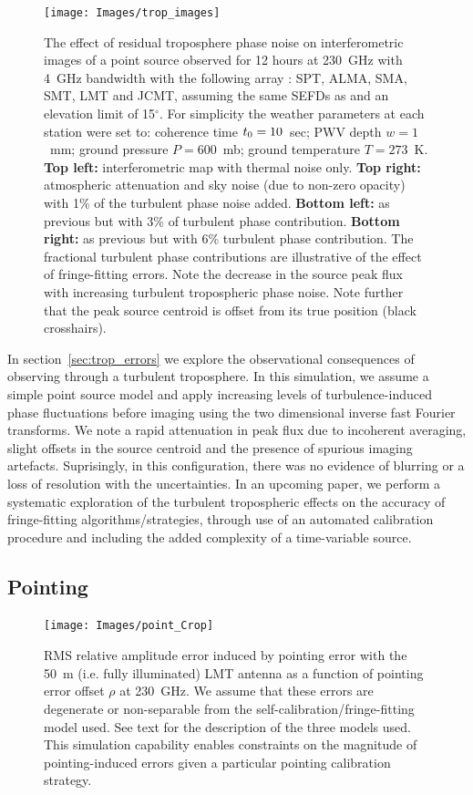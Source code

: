 \begin{figure}
\begin{center}
\texttt{[image: Images/trop\_images]}
\caption{The effect of residual troposphere phase noise on interferometric images of a point source observed for 12 hours at 230~GHz with 4~GHz bandwidth with the following array : SPT, ALMA, SMA, SMT, LMT and JCMT, assuming the same SEFDs as \protect\citet{Lu_2014} and an elevation limit of 15$^\circ$. For simplicity the weather parameters at each station were set to: coherence time $t_{\rm 0}=10$~sec; PWV depth $w=1$~mm; ground pressure $P=600$~mb; ground temperature $T =273$~K. {\bf Top left:} interferometric map with thermal noise only. {\bf Top right:} atmospheric attenuation and sky noise (due to non-zero opacity) with 1\% of the turbulent phase noise added. {\bf Bottom left:} as previous but with 3\% of turbulent phase contribution. {\bf Bottom right:} as previous but with 6\% turbulent phase contribution. The fractional turbulent phase contributions are illustrative of the effect of fringe-fitting errors. Note the decrease in the source peak flux with increasing turbulent tropospheric phase noise. Note further that the peak source centroid is offset from its true position (black crosshairs). \label{fig:trop_images}%
}
\end{center}
\end{figure}


In section~\ref{sec:trop_errors} we explore the observational consequences of observing through a turbulent troposphere. In this simulation, we assume a simple point source model and apply increasing levels of turbulence-induced phase fluctuations before imaging using the two dimensional inverse fast Fourier transforms. We note a rapid attenuation in peak flux due to incoherent averaging, slight offsets in the source centroid and the presence of spurious imaging artefacts. Suprisingly, in this configuration, there was no evidence of blurring or a loss of resolution with the uncertainties. In an upcoming paper, we perform a systematic exploration of the turbulent tropospheric effects on the accuracy of fringe-fitting algorithms/strategies, through use of an automated calibration procedure and including the added complexity of a time-variable source. 

\subsection{Pointing}

\begin{figure}
\begin{center}
\texttt{[image: Images/point\_Crop]}
\caption{RMS relative amplitude error induced by pointing error with the 50~m (i.e. fully illuminated) LMT antenna as a function of pointing error offset $\rho$ at 230~GHz. We assume that these errors are degenerate or non-separable from the self-calibration/fringe-fitting model used. See text for the description of the three models used. This simulation capability enables constraints on the magnitude of pointing-induced errors given a particular pointing calibration strategy.\label{fig:pointing}%
}
\end{center}
\end{figure}


